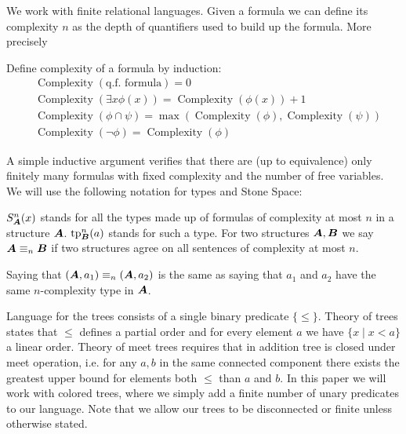 \documentclass{amsart}
\DeclareMathOperator{\A}{\boldface A}
\DeclareMathOperator{\B}{\boldface B}
\DeclareMathOperator{\cx}{Complexity}
\begin{document}
We work with finite relational languages. Given a formula we can define its complexity $n$ as the depth of quantifiers used to build up the formula. More precisely
\begin{Definition}
Define complexity of a formula by induction:
\begin{align*}
	&\cx(\text{q.f. formula}) = 0 \\
	&\cx(\exists x \phi(x)) = \cx(\phi(x)) + 1 \\
	&\cx(\phi \cap \psi) = \max(\cx(\phi), \cx(\psi)) \\
	&\cx(\neg \phi) = \cx(\phi)
\end{align*}
\end{Definition}
A simple inductive argument verifies that there are (up to equivalence) only finitely many formulas with fixed complexity and the number of free variables. We will use the following notation for types and Stone Space:
\begin{Definition}
\end{Definition}

$S^n_{\A}(x)$ stands for all the types made up of formulas of complexity at most $n$ in a structure $\A$. $\tp^n_{\B}(a)$ stands for such a type. For two structures $\A, \B$ we say $\A \equiv_n \B$ if two structures agree on all sentences of complexity at most $n$.

\begin{Note}
	Saying that $(\A, a_1) \equiv_n (\A, a_2)$ is the same as saying that $a_1$ and $a_2$ have the same $n$-complexity type in $\A$.
\end{Note}

Language for the trees consists of a single binary predicate $\{\leq\}$. Theory of trees states that $\leq$ defines a partial order and for every element $a$ we have $\{x \mid x < a\}$ a linear order. Theory of meet trees requires that in addition tree is closed under meet operation, i.e. for any $a, b$ in the same connected component there exists the greatest upper bound for elements both $\leq$ than $a$ and $b$. In this paper we will work with colored trees, where we simply add a finite number of unary predicates to our language. Note that we allow our trees to be disconnected or finite unless otherwise stated.
\end{document}
